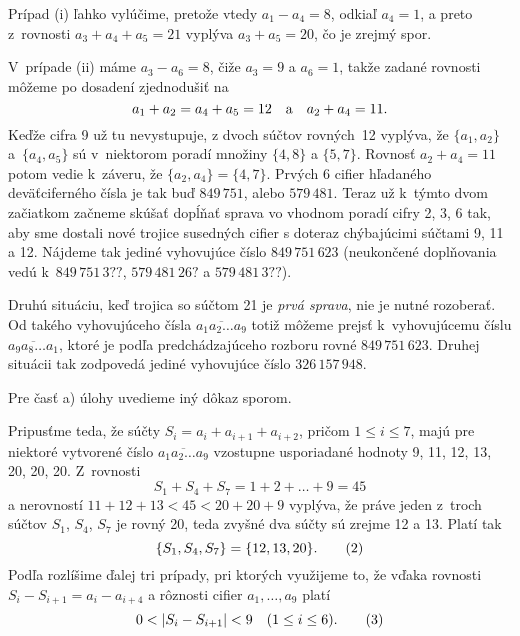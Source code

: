 {Prípad (i) ľahko vylúčime, pretože vtedy $a_1-a_4=8$, odkiaľ
$a_4=1$, a preto z~rovnosti $a_3+a_4+a_5=21$ vyplýva $a_3+a_5=20$,
čo je zrejmý spor.

V~prípade (ii) máme $a_3-a_6=8$, čiže $a_3=9$ a $a_6=1$, takže
zadané rovnosti môžeme po dosadení zjednodušiť na
$$
a_1+a_2=a_4+a_5=12\quad\hbox{a}\quad a_2+a_4=11.
$$
Keďže cifra 9 už tu nevystupuje, z dvoch súčtov
rovných~12 vyplýva, že $\{a_1, a_2\}$ a~$\{a_4, a_5\}$ sú v~niektorom poradí množiny $\{4, 8\}$ a
$\{5, 7\}$. Rovnosť $a_2+a_4=11$ potom vedie k~záveru, že
$\{a_2,a_4\}=\{4,7\}$. Prvých 6 cifier hľadaného deväťciferného
čísla je tak buď $849\,751$, alebo $579\,481$. Teraz už
k~týmto dvom začiatkom začneme skúšať dopĺňať sprava
vo vhodnom poradí cifry 2, 3, 6 tak, aby sme dostali nové
trojice susedných cifier s doteraz chýbajúcimi súčtami 9, 11 a 12.
Nájdeme tak jediné vyhovujúce číslo
$849\,751\,623$ (neukončené doplňovania vedú k~$849\,751\,3??$,
$579\,481\,26?$ a $579\,481\,3??$).

Druhú situáciu, keď trojica so súčtom 21 je \emph{prvá sprava}, nie je
nutné rozoberať. Od takého vyhovujúceho čísla
$\overline{a_1a_2 \dots a_9}$ totiž môžeme prejsť k~vyhovujúcemu číslu $\overline{a_9a_8 \dots a_1}$,
ktoré je podľa predchádzajúceho rozboru rovné $849\,751\,623$.
Druhej situácii tak zodpovedá jediné vyhovujúce číslo $326\,157\,948$.

\ineriesenie
Pre časť a) úlohy uvedieme iný dôkaz sporom.

Pripusťme teda, že súčty $S_i=a_i+a_{i+1}+a_{i+2}$,
pričom $1\leq i\leq7$, majú pre niektoré vytvorené číslo
$\overline{a_1a_2 \dots a_9}$ vzostupne usporiadané
hodnoty 9, 11, 12, 13, 20, 20, 20. Z~rovnosti
$$
S_1+S_4+S_7=1+2+\ldots+9=45
$$
a nerovností $11+12+13<45<20+20+9$ vyplýva, že práve jeden z~troch súčtov $S_1$, $S_4$, $S_7$ je rovný 20, teda zvyšné dva
súčty sú zrejme 12 a 13. Platí tak
$$
\{S_1,S_4,S_7\}=\{12,13,20\}.
\tag2
$$
Podľa  rozlíšime ďalej tri prípady, pri ktorých využijeme
to, že vďaka rovnosti ${S_i-S_{i+1}}={a_i-a_{i+4}}$ a rôznosti cifier
$a_1,\ldots,a_9$ platí
$$
0<|S_i-S_{i+1}|<9\quad(1\leq i\leq6).
\tag3
$$

}
